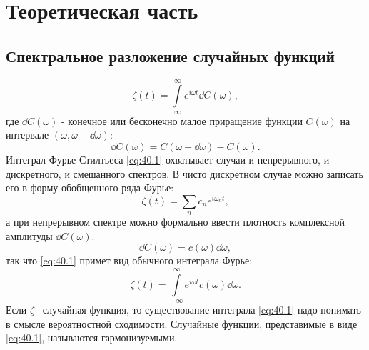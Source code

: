 
\section{Теоретическая часть}

\subsection{Спектральное разложение случайных функций}
\begin{equation}
	\label{eq:40.1}
	\zeta(t)= \int\limits_{\infty}^{\infty} e^{i \omega t} \dd{C(\omega)},
\end{equation}
где $\dd{C(\omega)}$ - конечное или бесконечно малое приращение функции $C(\omega)$ на интервале $(\omega, \omega+ \dd{\omega})$:
\begin{equation}
	\dd{C(\omega)}=C(\omega+\dd{\omega})-C(\omega).
\end{equation}
Интеграл Фурье-Стилтьеса \eqref{eq:40.1} охватывает случаи и непрерывного, и дискретного, и смешанного спектров. В чисто дискретном случае можно записать его в форму обобщенного ряда Фурье:
\begin{equation}
	\zeta(t)=\sum\limits_n c_n e^{i \omega_n t},
\end{equation}
а при непрерывном спектре можно формально ввести плотность комплексной амплитуды $\dd{C(\omega)}$:
\begin{equation}
	\dd{C(\omega)}= c(\omega) \dd{\omega},
\end{equation}
так что \eqref{eq:40.1} примет вид обычного интеграла Фурье:
\begin{equation}
	\zeta(t)=\int\limits_{-\infty}^{\infty} e^{i \omega t} c(\omega) \dd{\omega}.
\end{equation}
Если $\zeta$-- случайная функция, то существование интеграла \eqref{eq:40.1}
надо понимать в смысле вероятностной сходимости. Случайные функции, представимые в виде 
\eqref{eq:40.1}, называются гармонизуемыми.

